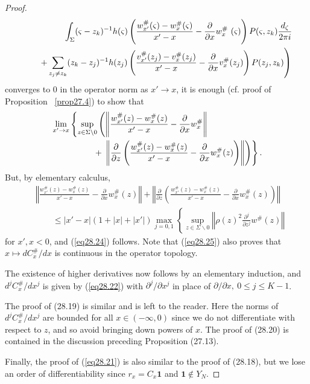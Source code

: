 \documentclass{surv-l}
\theoremstyle{plain}
\theoremstyle{definition}
\numberwithin{equation}{chapter}
\begin{document}
\begin{proof}
\begin{align}
&\qquad\qquad\quad\int_{\Sigma}(\varsigma-z_{k})^{-1}h(\varsigma)\left(\frac{w_{x'}^{\#}(\varsigma)-w_{x}^{\#}(\varsigma)}{x'-x}-\frac{\partial}{\partial x}w_{x}^{\#}\ (\varsigma)\right)P(\varsigma, z_{k})\frac{d_{\zeta}}{2\pi i}\\ \notag
&\quad\quad\left.+\sum_{z_{j}\neq z_{k}}(z_{k}-z_{j})^{-1}h(z_{j})\left(\frac{v_{x'}^{\#}(z_
{j})-v_{x}^{\#}(z_{j})}{x'-x}-\frac{\partial}{\partial x}v_{x}^{\#}(z_{j})\right)P(z_{j},z_{k}) \right)\nonumber
\end{align}
converges to $0$ in the operator norm as $x'\rightarrow x$, it is enough (cf. proof of Proposition ~\ref{prop27.4}) to show that
\begin{align}\label{eq28.25}
&\lim_{x'\rightarrow x}\left\{\sup_{z\in\Sigma\backslash 0}\left(\left\Vert\frac{w_{x'}^{\#}(z)-w_{x}^{\#}(z)}{x'-x}-\frac{\partial}{\partial x}w_{x}^{\#}\right\Vert\right.\right.\\
&\qquad\qquad\quad+\left.\left.\left\Vert\frac{\partial}{\partial z}\left(\frac{w_{x'}^{\#}(z)-w_{x}^{\#}(z)}{x'-x}-\frac{\partial}{\partial x}w_{x}^{\#}(z)\right)\right\Vert\right)\right\}. \notag
\end{align}
But, by elementary calculus,
\begin{align*}
&\left\Vert\frac{w_{x'}^{\#}(z)-w_{x}^{\#}(z)}{x'-x}-\frac{\partial}{\partial x}w_{x}^{\#}(z)\right\Vert+\left\Vert\frac{\partial}{\partial z}\left(\frac{w_{x'}^{\#}(z)-w_{x}^{\#}(z)}{x'-x}-\frac{\partial}{\partial x}w_{x}^{\#}(z)\right)\right\Vert\\
&\qquad\leq|x'-x|(1+|x|+|x'|)\max_{j=0,1}\left\{\sup_{z\in\Sigma\backslash 0}\left\Vert \rho(z)^{2}\frac{\partial^{j}}{\partial z^{j}}w^{\#}(z)\right\Vert\right.
\end{align*}
for $x',x<0$, and (\ref{eq28.24}) follows. Note that (\ref{eq28.25}) also proves that $x\mapsto dC_{x}^{\#}/dx$ is continuous in the operator topology.

The existence of higher derivatives now follows by an elementary induction, and $d^{j}C_{x}^{\#}/dx^{j}$ is given by (\ref{eq28.22}) with $\partial^{j}/\partial x^{j}$ in place of $\partial/\partial x,\ 0\leq j\leq K-1$.


The proof of (28.19) is similar and is left to the reader. Here the norms of $d^{j}C_{x}^{\#}/dx^{j}$ are bounded for all $x\in(-\infty,0)$ since we do not differentiate with respect to $z$, and so avoid bringing down powers of $x$. The proof of (28.20) is contained in the discussion preceding Proposition (27.13).

Finally, the proof of (\ref{eq28.21}) is also similar to the proof of (28.18), but we lose an order of differentiability since $r_{x}=C_{x}\mathbf{1}$ and $\mathbf{1}\not\in Y_{N}$.
\end{proof}
\end{document}
